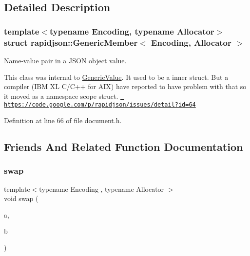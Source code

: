 \subsection{Detailed Description}
\subsubsection*{template$<$typename Encoding, typename Allocator$>$\newline
struct rapidjson\+::\+Generic\+Member$<$ Encoding, Allocator $>$}

Name-\/value pair in a J\+S\+ON object value. 

This class was internal to \mbox{\hyperlink{classrapidjson_1_1_generic_value}{Generic\+Value}}. It used to be a inner struct. But a compiler (I\+BM XL C/\+C++ for A\+IX) have reported to have problem with that so it moved as a namespace scope struct. \href{https://code.google.com/p/rapidjson/issues/detail?id=64}{\texttt{ https\+://code.\+google.\+com/p/rapidjson/issues/detail?id=64}} 

Definition at line 66 of file document.\+h.



\subsection{Friends And Related Function Documentation}
\mbox{\label{structrapidjson_1_1_generic_member_af72094da5f8967de3fab3d2c34bc71cc}} 
\subsubsection{\texorpdfstring{swap}{swap}}
{\footnotesize\ttfamily template$<$typename Encoding , typename Allocator $>$ \\
void swap (\begin{DoxyParamCaption}\item[{\mbox{\hyperlink{structrapidjson_1_1_generic_member}{Generic\+Member}}$<$ \mbox{\hyperlink{classrapidjson_1_1_encoding}{Encoding}}, \mbox{\hyperlink{classrapidjson_1_1_allocator}{Allocator}} $>$ \&}]{a,  }\item[{\mbox{\hyperlink{structrapidjson_1_1_generic_member}{Generic\+Member}}$<$ \mbox{\hyperlink{classrapidjson_1_1_encoding}{Encoding}}, \mbox{\hyperlink{classrapidjson_1_1_allocator}{Allocator}} $>$ \&}]{b }\end{DoxyParamCaption})\hspace{0.3cm}{\ttfamily [friend]}}



